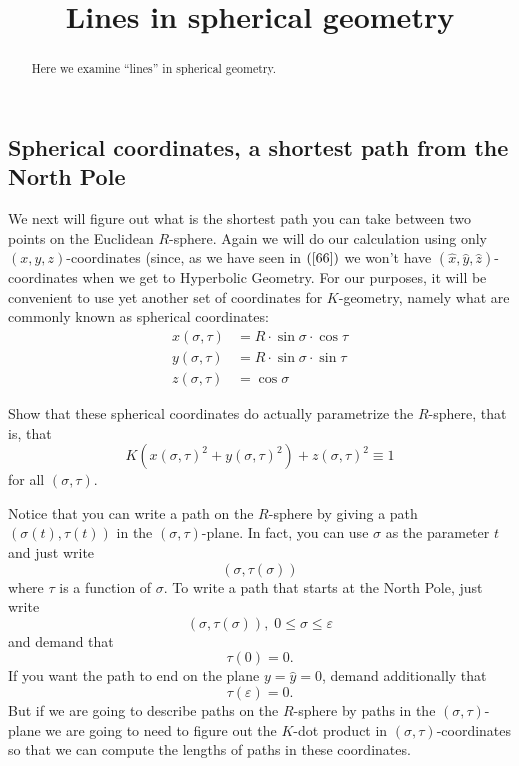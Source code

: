 \documentclass{ximera}
\title{Lines in spherical geometry}
\begin{document}
\begin{abstract}
Here we examine ``lines'' in spherical geometry.
\end{abstract}
\maketitle


\subsection*{Spherical coordinates, a shortest path from the North Pole}

We next will figure out what is the shortest path you can take between two
points on the Euclidean $R$-sphere. Again we will do our calculation using
only $\left(  x,y,z\right)  $-coordinates (since, as we have seen in $\left(
\ref{66}\right)  $ we won't have $\left(  \hat{x},\hat{y},\hat{z}\right)
$-coordinates when we get to Hyperbolic Geometry. For our purposes, it will be
convenient to use yet another set of coordinates for $K$-geometry, namely what
are commonly known as spherical coordinates:%
\begin{align}
x\left(  \sigma,\tau\right)   &  =R\cdot \sin%
\sigma\cdot \cos \tau\nonumber\\
y\left(  \sigma,\tau\right)   &  =R\cdot \sin%
\sigma\cdot \sin\tau\label{133}\\
z\left(  \sigma,\tau\right)   &  =\cos \sigma\nonumber
\end{align}


\begin{exercise}
Show that these spherical coordinates do actually parametrize
the $R$-sphere, that is, that%
\[
K\left(  x\left(  \sigma,\tau\right)  ^{2}+y\left(  \sigma,\tau\right)
^{2}\right)  +z\left(  \sigma,\tau\right)  ^{2}\equiv1
\]
for all $\left(  \sigma,\tau\right)  $.
\end{exercise}

Notice that you can write a path on the $R$-sphere by giving a path $\left(
\sigma\left(  t\right)  ,\tau\left(  t\right)  \right)  $ in the $\left(
\sigma,\tau\right)  $-plane. In fact, you can use $\sigma$ as the parameter
$t$ and just write
\begin{equation}
\left(  \sigma,\tau\left(  \sigma\right)  \right)  \label{62}%
\end{equation}
where $\tau$ is a function of $\sigma$. To write a path that starts at the
North Pole, just write%
\[
\left(  \sigma,\tau\left(  \sigma\right)  \right)  ,\;0\leq\sigma
\leq\varepsilon
\]
and demand that%
\[
\tau\left(  0\right)  =0.
\]
If you want the path to end on the plane $y=\hat{y}=0$, demand additionally
that%
\[
\tau\left(  \varepsilon\right)  =0.
\]
But if we are going to describe paths on the $R$-sphere by paths in the
$\left(  \sigma,\tau\right)  $-plane we are going to need to figure out the
$K$-dot product in $\left(  \sigma,\tau\right)  $-coordinates so that we can
compute the lengths of paths in these coordinates.
\end{document}
